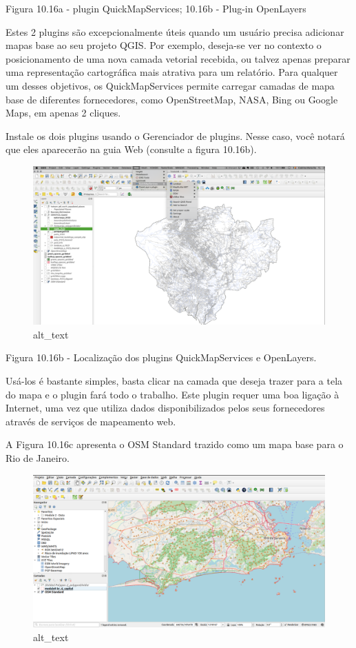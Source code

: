 \documentclass[
  portuguese,
]{krantz}
\begin{document}
Figura 10.16a - plugin QuickMapServices; 10.16b - Plug-in OpenLayers

Estes 2 plugins são excepcionalmente úteis quando um usuário precisa adicionar mapas base ao seu projeto QGIS. Por exemplo, deseja-se ver no contexto o posicionamento de uma nova camada vetorial recebida, ou talvez apenas preparar uma representação cartográfica mais atrativa para um relatório. Para qualquer um desses objetivos, os QuickMapServices permite carregar camadas de mapa base de diferentes fornecedores, como OpenStreetMap, NASA, Bing ou Google Maps, em apenas 2 cliques.

Instale os dois plugins usando o Gerenciador de plugins. Nesse caso, você notará que eles aparecerão na guia Web (consulte a figura 10.16b).

\begin{figure}
\centering
\includegraphics{media/modulo10/fig1016_b.png}
\caption{alt\_text}
\end{figure}

Figura 10.16b - Localização dos plugins QuickMapServices e OpenLayers.

Usá-los é bastante simples, basta clicar na camada que deseja trazer para a tela do mapa e o plugin fará todo o trabalho. Este plugin requer uma boa ligação à Internet, uma vez que utiliza dados disponibilizados pelos seus fornecedores através de serviços de mapeamento web.

A Figura 10.16c apresenta o OSM Standard trazido como um mapa base para o Rio de Janeiro.

\begin{figure}
\centering
\includegraphics{media/modulo10/fig1016_c.png}
\caption{alt\_text}
\end{figure}
\end{document}
